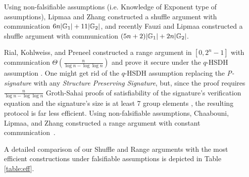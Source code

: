 Using non-falsifiable assumptions (i.e. Knowledge of Exponent type of assumptions), Lipmaa and Zhang \cite{SCN:LipZha12} constructed a shuffle argument with communication $6n|\mathbb{G}_1|+11|\mathbb{G}_2|$, and recently Fauzi and Lipmaa  \cite{EPRINT:FauLip15} constructed a shuffle argument with communication $(5n+2)|\mathbb{G}_1|+2n|\mathbb{G}_2|$.

Rial, Kohlweiss, and Preneel constructed a range argument in $[0,2^n-1]$ with communication $\Theta(\frac{n}{\log n -\log\log n})$ and prove it secure under the $q$-HSDH assumption \cite{PAIRING:RiaKohPre09}. One might get rid of the $q$-HSDH assumption replacing the \emph{P-signature} with any \emph{Structure Preserving Signature}, but, since the proof requires $\frac{n}{\log n-\log \log n}$ Groth-Sahai proofs of satisfiability of the signature's verification equation and the signature's size is at least 7 group elements \cite{C:KilPanWee15}, the resulting protocol is far less efficient.
Using non-falsifiable assumptions, Chaabouni, Lipmaa, and Zhang constructed a range argument with constant communication~\cite{FC:ChaLipZha12}. 

A detailed comparison of our Shuffle and Range arguments with the most efficient constructions under falsifiable assumptions is depicted in Table \ref{table:eff}.



